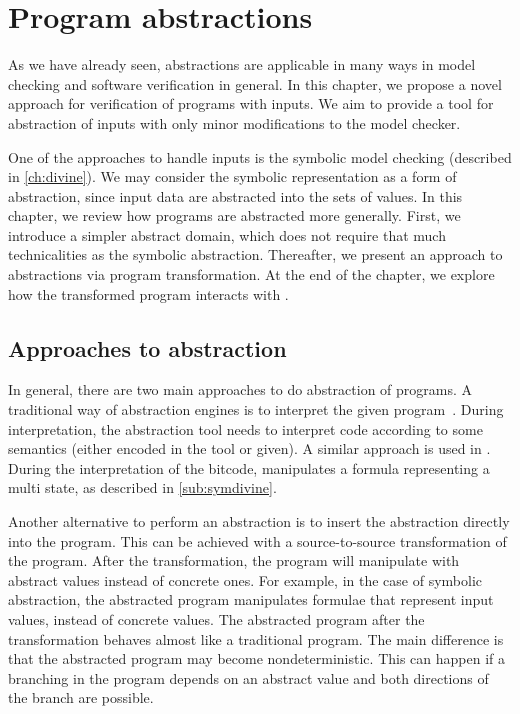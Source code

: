 \chapter{Program abstractions}\label{ch:abstraction}

As we have already seen, abstractions are applicable in many ways in model
checking and software verification in general. In this chapter, we propose a novel
approach for verification of programs with inputs. We aim to provide a tool for
abstraction of inputs with only minor modifications to the model checker.

One of the approaches to handle inputs is the symbolic model checking (described
in \autoref{ch:divine}). We may consider the symbolic representation as a form
of abstraction, since input data are abstracted into the sets of values. In this
chapter, we review how programs are abstracted more generally. First, we
introduce a simpler abstract domain, which does not require that much technicalities as the symbolic abstraction. Thereafter, we present an
approach to abstractions via program transformation. At the end of the chapter,
we explore how the transformed program interacts with \DIVINE.

\section{Approaches to abstraction}

In general, there are two main approaches to do abstraction of programs. A
traditional way of abstraction engines is to interpret the given
program~\cite{Cousot79}. During interpretation, the abstraction tool needs to
interpret code according to some semantics (either encoded in the tool or
given). A similar approach is used in \SymDIVINE. During the interpretation of
the \LLVM bitcode, \SymDIVINE manipulates a formula representing a multi state,
as described in \autoref{sub:symdivine}.

Another alternative to perform an abstraction is to insert the abstraction
directly into the program. This can be achieved with a source-to-source
transformation of the program. After the transformation, the program will
manipulate with abstract values instead of concrete ones. For example, in the
case of symbolic abstraction, the abstracted program manipulates formulae that
represent input values, instead of concrete values. The abstracted program after
the transformation behaves almost like a traditional program. The main difference
is that the abstracted program may become nondeterministic. This can happen if
a branching in the program depends on an abstract value and both directions of
the branch are possible.

